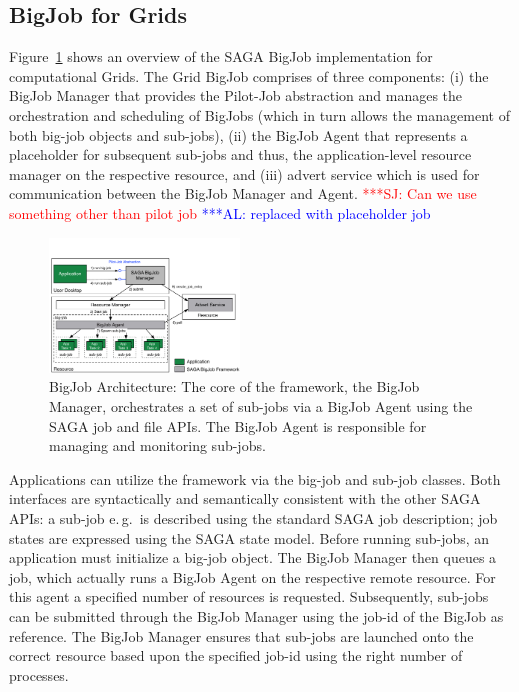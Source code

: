 \documentclass[conference,final]{IEEEtran}
\newcommand{\up}{\vspace*{-1em}}
\newcommand{\alnote}[1]{ {\textcolor{blue} { ***AL: #1 }}}
\newcommand{\jhanote}[1]{ {\textcolor{red} { ***SJ: #1 }}}
\newcommand{\alnote}[1]{}
\newcommand{\jhanote}[1]{}
\begin{document}


\subsection{BigJob for Grids}
\up

Figure~\ref{fig:figures_bigjob} shows an overview of the SAGA BigJob
implementation for computational Grids. The Grid BigJob comprises of
three components: (i) the BigJob Manager that provides the Pilot-Job
abstraction and manages the orchestration and scheduling of BigJobs
(which in turn allows the management of both big-job objects and
sub-jobs), (ii) the BigJob Agent that represents a placeholder for
subsequent sub-jobs and thus, the application-level resource manager 
on the respective resource, and
(iii) advert service which is used for communication between the
BigJob Manager and Agent.
\jhanote{Can we use something other than pilot job} \alnote{replaced
with placeholder job}

\begin{figure}[ht]
    \centering
    \includegraphics[width=0.45\textwidth]{figures/bigjob}
   \caption{BigJob Architecture: The core of the framework, the
      BigJob Manager, orchestrates a set of sub-jobs via a
      BigJob Agent using the SAGA job and file APIs.  The
      BigJob Agent is responsible for managing and monitoring sub-jobs.\up}
   \label{fig:figures_bigjob}
\end{figure}

Applications can utilize the framework via the big-job and sub-job
classes. Both interfaces are syntactically and semantically consistent
with the other SAGA APIs: a sub-job e.\,g.\ is described using 
the standard SAGA job description; job states are expressed
using the SAGA state model. Before running sub-jobs, an application must initialize
a big-job object. The BigJob Manager then queues a job,
which actually runs a BigJob Agent on the respective remote
resource. For this agent a specified number of resources is
requested. Subsequently, sub-jobs can be submitted through the BigJob
Manager using the job-id of the BigJob as reference. The BigJob
Manager ensures that sub-jobs are launched onto the correct
resource based upon the specified job-id using the right number of
processes. 
\end{document}
